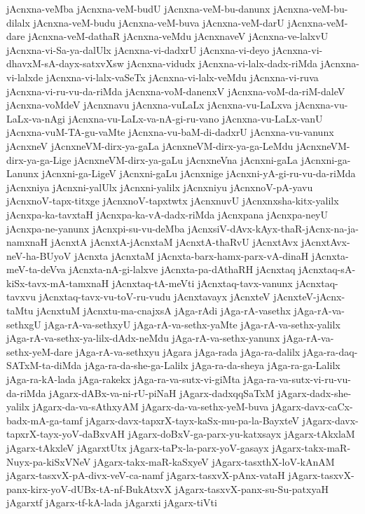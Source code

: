 {jAcnxna-veMba
jAcnxna-veM-budU
jAcnxna-veM-bu-danunx
jAcnxna-veM-bu-dilalx
jAcnxna-veM-budu
jAcnxna-veM-buva
jAcnxna-veM-darU
jAcnxna-veM-dare
jAcnxna-veM-dathaR
jAcnxna-veMdu
jAcnxnaveV
jAcnxna-ve-lalxvU
jAcnxna-vi-Sa-ya-dalUlx
jAcnxna-vi-dadxrU
jAcnxna-vi-deyo
jAcnxna-vi-dhavxM-sA-dayx-satxvXsw
jAcnxna-vidudx
jAcnxna-vi-lalx-dadx-riMda
jAcnxna-vi-lalxde
jAcnxna-vi-lalx-vaSeTx
jAcnxna-vi-lalx-veMdu
jAcnxna-vi-ruva
jAcnxna-vi-ru-vu-da-riMda
jAcnxna-voM-danenxV
jAcnxna-voM-da-riM-daleV
jAcnxna-voMdeV
jAcnxnavu
jAcnxna-vuLaLx
jAcnxna-vu-LaLxva
jAcnxna-vu-LaLx-va-nAgi
jAcnxna-vu-LaLx-va-nA-gi-ru-vano
jAcnxna-vu-LaLx-vanU
jAcnxna-vuM-TA-gu-vaMte
jAcnxna-vu-baM-di-dadxrU
jAcnxna-vu-vanunx
jAcnxneV
jAcnxneVM-dirx-ya-gaLa
jAcnxneVM-dirx-ya-ga-LeMdu
jAcnxneVM-dirx-ya-ga-Lige
jAcnxneVM-dirx-ya-gaLu
jAcnxneVna
jAcnxni-gaLa
jAcnxni-ga-Lanunx
jAcnxni-ga-LigeV
jAcnxni-gaLu
jAcnxnige
jAcnxni-yA-gi-ru-vu-da-riMda
jAcnxniya
jAcnxni-yalUlx
jAcnxni-yalilx
jAcnxniyu
jAcnxnoV-pA-yavu
jAcnxnoV-tapx-titxge
jAcnxnoV-tapxtwtx
jAcnxnuvU
jAcnxnxsha-kitx-yalilx
jAcnxpa-ka-tavxtaH
jAcnxpa-ka-vA-dadx-riMda
jAcnxpana
jAcnxpa-neyU
jAcnxpa-ne-yanunx
jAcnxpi-su-vu-deMba
jAcnxsiV-dAvx-kAyx-thaR-jAcnx-na-ja-namxnaH
jAcnxtA
jAcnxtA-jAcnxtaM
jAcnxtA-thaRvU
jAcnxtAvx
jAcnxtAvx-neV-ha-BUyoV
jAcnxta
jAcnxtaM
jAcnxta-barx-hamx-parx-vA-dinaH
jAcnxta-meV-ta-deVva
jAcnxta-nA-gi-lalxve
jAcnxta-pa-dAthaRH
jAcnxtaq
jAcnxtaq-sA-kiSx-tavx-mA-tamxnaH
jAcnxtaq-tA-meVti
jAcnxtaq-tavx-vanunx
jAcnxtaq-tavxvu
jAcnxtaq-tavx-vu-toV-ru-vudu
jAcnxtavayx
jAcnxteV
jAcnxteV-jAcnx-taMtu
jAcnxtuM
jAcnxtu-ma-cnajxsA
jAga-rAdi
jAga-rA-vasethx
jAga-rA-va-sethxgU
jAga-rA-va-sethxyU
jAga-rA-va-sethx-yaMte
jAga-rA-va-sethx-yalilx
jAga-rA-va-sethx-ya-lilx-dAdx-neMdu
jAga-rA-va-sethx-yanunx
jAga-rA-va-sethx-yeM-dare
jAga-rA-va-sethxyu
jAgara
jAga-rada
jAga-ra-dalilx
jAga-ra-daq-SATxM-ta-diMda
jAga-ra-da-she-ga-Lalilx
jAga-ra-da-sheya
jAga-ra-ga-Lalilx
jAga-ra-kA-lada
jAga-rakekx
jAga-ra-va-sutx-vi-giMta
jAga-ra-va-sutx-vi-ru-vu-da-riMda
jAgarx-dABx-va-ni-rU-piNaH
jAgarx-dadxqqSaTxM
jAgarx-dadx-she-yalilx
jAgarx-da-va-sAthxyAM
jAgarx-da-va-sethx-yeM-buva
jAgarx-davx-caCx-badx-mA-ga-tamf
jAgarx-davx-tapxrX-tayx-kaSx-mu-pa-la-BayxteV
jAgarx-davx-tapxrX-tayx-yoV-daBxvAH
jAgarx-doBxV-ga-parx-yu-katxsayx
jAgarx-tAkxlaM
jAgarx-tAkxleV
jAgarxtUtx
jAgarx-taPx-la-parx-yoV-gasayx
jAgarx-takx-maR-Nuyx-pa-kiSxVNeV
jAgarx-takx-maR-kaSxyeV
jAgarx-tasxthX-loV-kAnAM
jAgarx-tasxvX-pA-divx-veV-ca-namf
jAgarx-tasxvX-pAnx-vataH
jAgarx-tasxvX-panx-kirx-yoV-dUBx-tA-nf-BukAtxvX
jAgarx-tasxvX-panx-su-Su-patxyaH
jAgarxtf
jAgarx-tf-kA-lada
jAgarxti
jAgarx-tiVti
}
